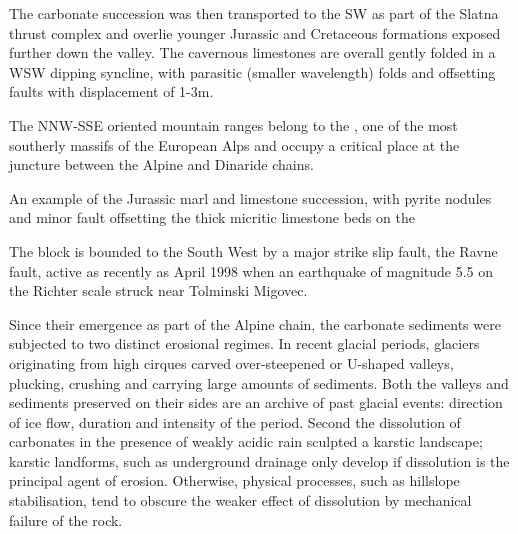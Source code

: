 The carbonate succession was then transported to the SW as part of the Slatna thrust complex and overlie younger Jurassic and Cretaceous formations exposed further down the valley. The  cavernous limestones are overall gently folded in a WSW dipping syncline, with parasitic (smaller wavelength) folds and offsetting faults with displacement of 1-3m.

 The NNW-SSE oriented mountain ranges belong to the , one of the most southerly massifs of the European Alps and occupy a critical place at the juncture between the Alpine and Dinaride chains. 
 
 
\begin{marginfigure}
\checkoddpage \ifoddpage \forcerectofloat \else \forceversofloat \fi
\centering
 \caption{An example of the Jurassic marl and limestone succession, with pyrite nodules and minor fault offsetting the thick micritic limestone beds  on the \protect{}}
 \label{marls and limestones}
\end{marginfigure}

 The block is bounded to the South West by a major strike slip fault, the Ravne fault, active as recently as April 1998 when an earthquake of magnitude 5.5 on the Richter scale struck near Tolminski Migovec.

Since their emergence as part of the Alpine chain, the carbonate sediments were subjected to two distinct erosional regimes. In recent glacial periods, glaciers originating from high cirques carved over-steepened or U-shaped valleys, plucking, crushing and carrying large amounts of sediments. Both the valleys and sediments preserved on their sides are an archive of past glacial events: direction of ice flow, duration and intensity of the period. Second the dissolution of carbonates in the presence of weakly acidic rain sculpted a karstic landscape; karstic landforms, such as underground drainage only develop if dissolution is the principal agent of erosion. Otherwise, physical processes, such as hillslope stabilisation, tend to obscure the weaker effect of dissolution by mechanical failure of the rock.
